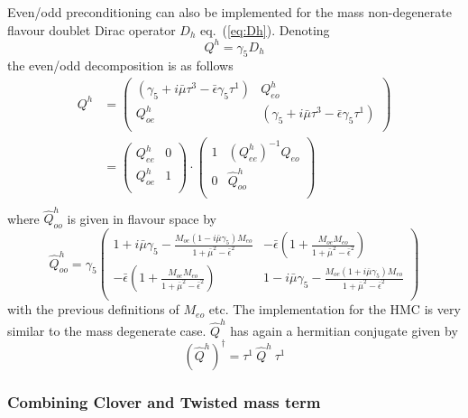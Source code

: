 Even/odd preconditioning can also be implemented for the mass
non-degenerate flavour doublet Dirac operator $D_h$
eq.~(\ref{eq:Dh}). Denoting 
\[
Q^h = \gamma_5 D_h
\]
the even/odd decomposition is as follows
\begin{equation}
  \label{eq:Dheo}
  \begin{split}
    Q^h &=
    \begin{pmatrix}
      (\gamma_5+i\bar\mu\tau^3 -\bar\epsilon\gamma_5\tau^1) & Q^h_{eo}\\
      Q^h_{oe} & (\gamma_5+i\bar\mu\tau^3 -\bar\epsilon\gamma_5\tau^1)\\
    \end{pmatrix} \\
    &=
    \begin{pmatrix}
      Q^h_{ee} & 0 \\
      Q^h_{oe} & 1 \\
    \end{pmatrix}
    \cdot
    \begin{pmatrix}
      1 & (Q^h_{ee})^{-1}Q_{eo} \\
      0 & \hat Q^h_{oo} \\
    \end{pmatrix} \\
  \end{split}
\end{equation}
where $\hat Q^h_{oo}$ is given in flavour space by
\begin{equation*}
  \hat Q^h_{oo} = \gamma_5
  \begin{pmatrix}
    1 + i\bar\mu\gamma_5 -
    \frac{M_{oe}(1-i\bar\mu\gamma_5)M_{eo}}{1+\bar\mu^2-\bar\epsilon^2} & 
    -\bar\epsilon\left(1+\frac{M_{oe}M_{eo}}{1+\bar\mu^2-\bar\epsilon^2}\right) \\
    -\bar\epsilon\left(1+\frac{M_{oe}M_{eo}}{1+\bar\mu^2-\bar\epsilon^2}\right) & 
    1 - i\bar\mu\gamma_5 -
    \frac{M_{oe}(1+i\bar\mu\gamma_5)M_{eo}}{1+\bar\mu^2-\bar\epsilon^2}\\
  \end{pmatrix}
\end{equation*}
with the previous definitions of $M_{eo}$ etc. The implementation for
the HMC is very similar to the mass degenerate case. $\hat Q^h$ has
again a hermitian conjugate given by
\[
(\hat Q^h)^\dagger = \tau^1\ \hat Q^h\ \tau^1
\]

\subsubsection{Combining Clover and Twisted mass term} \label{sec:clover_twist}

